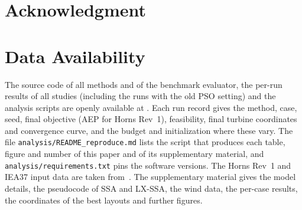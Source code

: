 \section*{Acknowledgment}

\section*{Data Availability}
The source code of all methods and of the benchmark evaluator, the per-run results of all studies (including the runs with the old PSO setting) and the analysis scripts are openly available at . Each run record gives the method, case, seed, final objective (AEP for Horns Rev~1), feasibility, final turbine coordinates and convergence curve, and the budget and initialization where these vary. The file \texttt{analysis/README\_reproduce.md} lists the script that produces each table, figure and number of this paper and of its supplementary material, and \texttt{analysis/requirements.txt} pins the software versions. The Horns Rev~1 and IEA37 input data are taken from~\cite{PyWake,IEA37repo}. The supplementary material gives the model details, the pseudocode of SSA and LX-SSA, the wind data, the per-case results, the coordinates of the best layouts and further figures.

